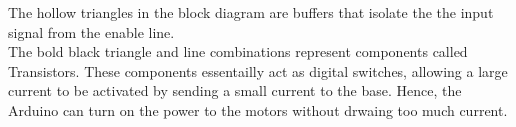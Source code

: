\documentclass[../TinyBot.tex]{subfiles}
\begin{document}
The hollow triangles in the block diagram are buffers that isolate the the input signal from
the enable line. \\

The bold black triangle and line combinations represent components called Transistors. These
components essentailly act as digital switches, allowing a large current to be activated
by sending a small current to the base. Hence, the Arduino can turn on the power to the
motors without drwaing too much current. \\


    
        




\end{document}
